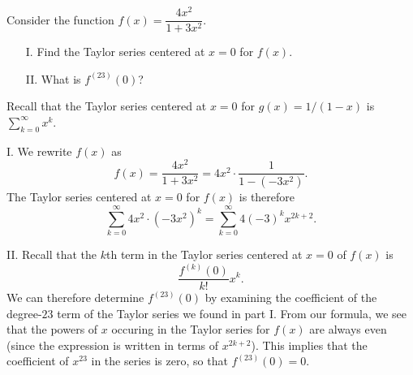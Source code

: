 \documentclass[noauthor]{ximera}
\begin{document}
\begin{problem} 
Consider the function $f(x) = \dfrac{4x^2}{1+3x^2}.$

\begin{itemize}
\item[I.] Find the Taylor series centered at $x=0$ for $f(x)$.
\item[II.] What is $f^{(23)}(0)$?
\end{itemize}

\begin{freeResponse}
Recall that the Taylor series centered at $x=0$ for $g(x) =1/(1-x)$ is $\sum_{k=0}^\infty x^k$. 

I. We rewrite $f(x)$ as
$$
f(x) = \frac{4x^2}{1+3x^2} = 4x^2 \cdot \frac{1}{1-(-3x^2)}.
$$
The Taylor series centered at $x=0$ for $f(x)$ is therefore
$$
\sum_{k=0}^\infty 4x^2 \cdot (-3x^2)^k = \sum_{k=0}^\infty 4  (-3)^k x^{2k+2}.
$$

II. Recall that the $k$th term in the Taylor series centered at $x=0$ of $f(x)$ is 
$$
\frac{f^{(k)}(0)}{k!} x^k.
$$
We can therefore determine $f^{(23)}(0)$ by examining the coefficient of the degree-$23$ term of the Taylor series we found in part I. From our formula, we see that the powers of $x$ occuring in the Taylor series for $f(x)$ are always even (since the expression is written in terms of $x^{2k+2}$). This implies that the coefficient of $x^{23}$ in the series is zero, so that $f^{(23)}(0)=0$.
\end{freeResponse}
\end{problem}
\end{document}
